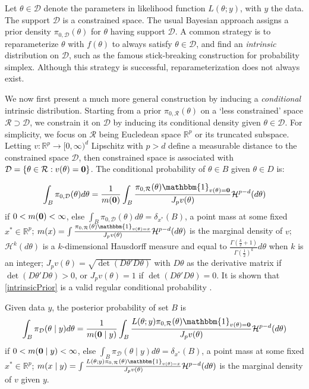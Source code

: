 \documentclass[10pt]{article}
\newcommand{\bb}[1]{\mathbb{#1}}
\newcommand{\mc}[1]{\mathcal{#1}}
\DeclareMathOperator{\1}{\mathbbm{1}}
\begin{document}
Let $\theta \in \mc D$ denote the parameters in likelihood function $L(\theta;y)$, with $y$ the data. The support $\mc D$ is a constrained space. The usual Bayesian approach assigns a prior density $\pi_{0,\mc D}(\theta)$ for $\theta$ having support $\mc D$. 
A common strategy is to reparameterize $\theta$ with $f(\theta)$ to always satisfy $\theta \in \mc D$, and find an {\it intrinsic} distribution on $\mc D$, such as the famous stick-breaking construction for probability simplex. Although this strategy is successful, reparameterization does not always exist.

We now first present a much more general construction by inducing a {\it conditional} intrinsic distribution. Starting from a prior $\pi_{0,\mc R}(\theta)$ on a `less constrained' space $\mc R\supset \mc D$, we constrain it on $\mc D$ by inducing its conditional density given $\theta\in \mc D$. For simplicity, we focus on $\mc R$ being Eucledean space $\mathbb{R}^{p}$ or its truncated subspace. Letting  $v: \bb{R}^p\rightarrow \bb [0,\infty)^d$ Lipschitz with $p>d$ define a measurable distance to the constrained space $\mc D$, then constrained space is associated with $\mc D = \{\theta\in \mc R:v(\theta)=\bf 0\}$. The conditional probability of $\theta\in B$ given $\theta\in D$ is:

\begin{equation}
\label{intrinsicPrior}
	\int_{B}\pi_{0,\mc D}(\theta)d\theta= \frac{1}{m(\bf 0)}\int_{B} \frac{\pi_{0,\mc R}(\theta) \mathbbm{1}_{v({\theta})={\bf 0}}}{J_p v(\theta)}\mc H^{p-d}(d\theta)
\end{equation}
if $0<m(\bf 0)<\infty$, else $\int_{B}\pi_{0,\mc D}(\theta)d\theta= \delta_{x^*}(B)$, a point mass at some fixed $x^{*}\in \bb R^p$; $m(x)= \int \frac{\pi_{0,\mc R}(\theta)\mathbbm{1}_{v({\theta})=x}}{J_p v(\theta)}\mc H^{p-d}(d\theta)$ is the marginal density of $v$; $\mc H^{k}(d\theta)$ is a $k$-dimensional Hausdorff measure and equal to $\frac{\Gamma(\frac{k}{2}+1)}{\Gamma(\frac{1}{2})^k} d\theta$ when $k$ is an integer;  $J_p v(\theta) = \sqrt{\det (D\theta' D\theta)}$  with $D\theta$ as the derivative matrix if $\det (D\theta' D\theta)>0$, or $J_p v(\theta) =1$ if $\det (D\theta' D\theta)=0$. It is shown that \eqref{intrinsicPrior} is a valid regular conditional probability \citep{diaconis2013manifold}.

Given data $y$, the posterior probability of set $B$ is
\begin{equation}
\label{intrinsicPosterior}
	\int_{B}\pi_{\mc D}(\theta \mid y)d\theta= \frac{1}{m({\bf 0} \mid y)}\int_{B} \frac{L(\theta;y)\pi_{0,\mc R}(\theta) \mathbbm{1}_{v({\theta})={\bf 0}}}{J_p v(\theta)}\mc H^{p-d}(d\theta)
\end{equation}
if $0<m({\bf 0} \mid y)<\infty$, else $\int_{B}\pi_{\mc D}(\theta \mid y)d\theta= \delta_{x^*}(B)$, a point mass at some fixed $x^{*}\in \bb R^p$; $m(x\mid y)= \int \frac{L(\theta;y)\pi_{0,\mc R}(\theta)\mathbbm{1}_{v({\theta})=x}}{J_p v(\theta)}\mc H^{p-d}(d\theta)$ is the marginal density of $v$ given $y$.
\end{document}
